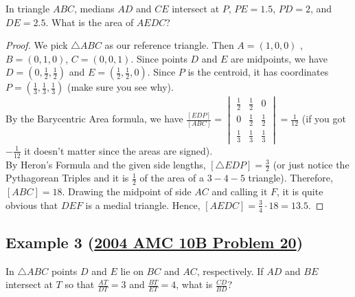 \documentclass[11pt]{scrartcl}
\begin{document}
\begin{problem}
In triangle $ABC$, medians $AD$ and $CE$ intersect at $P$, $PE=1.5$, $PD=2$, and $DE=2.5$. What is the area of $AEDC$?
\end{problem}

\begin{proof}
    We pick $\bigtriangleup ABC$ as our reference triangle. Then $A=(1,0,0)$ , $B=(0,1,0)$, $C=(0,0,1)$. Since points $D$ and $E$ are midpoints, we have $D=(0,\frac 12,\frac 12)$ and $E=(\frac 12,\frac 12,0)$. Since $P$ is the centroid, it has coordinates $P=(\frac13,\frac13,\frac13)$ (make sure you see why). \\
    
    By the Barycentric Area formula, we have $\frac{[EDP]}{[ABC]}=\begin{vmatrix}
\frac 12 &\frac 12 &0 \\
0 &\frac 12 &\frac 12 \\
\frac 13& \frac 13&\frac 13
\end{vmatrix} = \frac {1}{12}$ (if you got $-\frac {1}{12}$ it doesn't matter since the areas are signed). \\

By Heron's Formula and the given side lengths, $[\triangle EDP]=\frac 32$ (or just notice the Pythagorean Triples and it is $\frac 12$ of the area of a $3-4-5$ triangle). Therefore, $[ABC]=18$. Drawing the midpoint of side $AC$ and calling it $F$, it is quite obvious that $DEF$ is a medial triangle. Hence, $[AEDC]=\frac 34 \cdot 18 = 13.5$.
\end{proof}



\subsection{Example 3 (\href{https://artofproblemsolving.com/community/c4h251367}{2004 AMC 10B Problem 20})}

\begin{problem}
In $\triangle ABC$ points $D$ and $E$ lie on $BC$ and $AC$, respectively. If $AD$ and $BE$ intersect at $T$ so that $\frac{AT}{DT}=3$ and $\frac{BT}{ET}=4$, what is $\frac{CD}{BD}$?
\end{problem}
\end{document}

